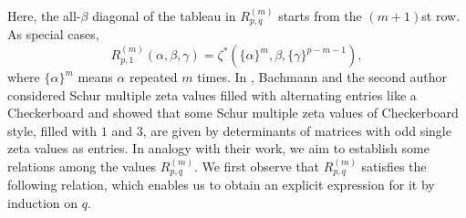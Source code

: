 \documentclass[12pt]{amsart}%
\theoremstyle{definition}
\newcommand{\tcdots}{\text{\tiny \hspace{1.5pt}$\cdots$}}
\newcommand{\tvdots}{\text{\tiny \raisebox{-1.5pt}{$\vdots$}}}
\newcommand{\tddots}{\text{\tiny \raisebox{-1.5pt}{$\ddots$}}}
\begin{document}
\[%
\]
Here, the all-$\beta$ diagonal of the tableau in $R^{(m)}_{p,q}$ starts from the $(m+1)$st row.
As special cases, 
\begin{equation}
\label{for:9thRectangle initial}
R^{(m)}_{p,1}(\alpha,\beta,\gamma)
=\zeta^{\ast}(\{\alpha\}^{m},\beta,\{\gamma\}^{p-m-1}),
\end{equation}
where $\{\alpha\}^m$ means $\alpha$ repeated $m$ times. 
In \cite{by}, Bachmann and the second author considered Schur multiple zeta values filled with alternating entries like a Checkerboard and showed that some Schur multiple zeta values of Checkerboard style, filled with $1$ and $3$, are given by determinants of matrices with odd single zeta values as entries. In analogy with their work, we aim to establish some relations among the values $R_{p,q}^{(m)}$.
We first observe that $R^{(m)}_{p,q}$ satisfies the following relation, which enables us to obtain an explicit expression for it by induction on $q$.
\end{document}
